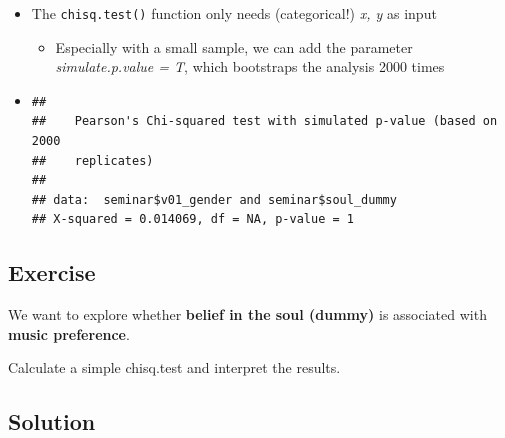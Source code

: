 \documentclass[
]{book}
\newenvironment{Shaded}{\begin{snugshade}}{\end{snugshade}}
\newcommand{\AttributeTok}[1]{\textcolor[rgb]{0.13,0.29,0.53}{#1}}
\newcommand{\FunctionTok}[1]{\textcolor[rgb]{0.13,0.29,0.53}{\textbf{#1}}}
\newcommand{\NormalTok}[1]{#1}
\newcommand{\SpecialCharTok}[1]{\textcolor[rgb]{0.81,0.36,0.00}{\textbf{#1}}}
\providecommand{\tightlist}{%
  \setlength{\itemsep}{0pt}\setlength{\parskip}{0pt}}
\begin{document}
\begin{itemize}
\item
  The \texttt{chisq.test()} function only needs (categorical!) \emph{x, y} as input

  \begin{itemize}
  \tightlist
  \item
    Especially with a small sample, we can add the parameter \emph{simulate.p.value = T}, which bootstraps the analysis 2000 times
  \end{itemize}
\item
\begin{Shaded}
\end{Shaded}

\begin{verbatim}
## 
##    Pearson's Chi-squared test with simulated p-value (based on 2000
##    replicates)
## 
## data:  seminar$v01_gender and seminar$soul_dummy
## X-squared = 0.014069, df = NA, p-value = 1
\end{verbatim}
\end{itemize}

\subsection{\texorpdfstring{Exercise }{Exercise  }}\label{exercise-6}

We want to explore whether \textbf{belief in the soul (dummy)} is associated with \textbf{music preference}.

Calculate a simple chisq.test and interpret the results.

\subsection{\texorpdfstring{Solution }{Solution  }}\label{solution-10}

\begin{Shaded}
\end{Shaded}
\end{document}
